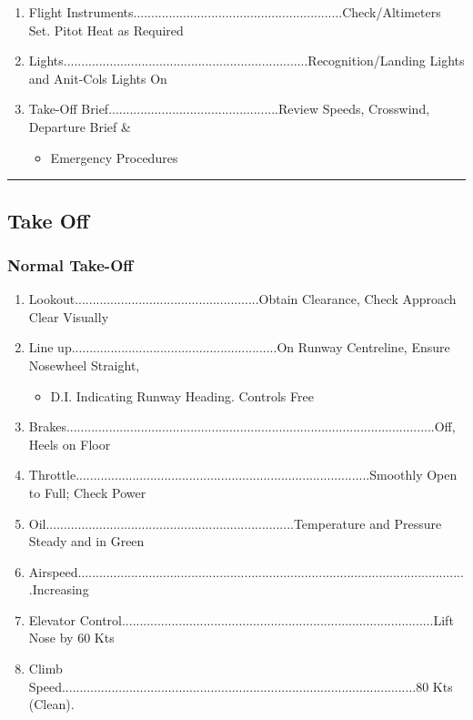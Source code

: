 \documentclass[a4paper]{article}
\newenvironment{checklist}{
  \begin{itemize}[leftmargin=*, align=left]
    \setlength{\itemsep}{2pt}
    \setlength{\parskip}{0pt}
    \setlength{\parsep}{0pt}
}{
  \end{itemize}
}
\newenvironment{numberedchecklist}{
  \begin{enumerate}[label=\arabic*., leftmargin=*, align=left]
    \setlength{\itemsep}{2pt}
    \setlength{\parskip}{0pt}
    \setlength{\parsep}{0pt}
}{
  \end{enumerate}
}
\begin{document}
\begin{numberedchecklist}
\item Flight Instruments...........................................................Check/Altimeters Set. Pitot Heat as Required
\item Lights.....................................................................Recognition/Landing Lights and Anit-Cols Lights On
\item Take-Off Brief................................................Review Speeds, Crosswind, Departure Brief \&
  \begin{checklist}
  \item Emergency Procedures
  \end{checklist}
\end{numberedchecklist}

\rule{\linewidth}{0.4pt}

\subsection*{Take Off}

\subsubsection*{Normal Take-Off}
\begin{numberedchecklist}
\item Lookout....................................................Obtain Clearance, Check Approach Clear Visually
\item Line up..........................................................On Runway Centreline, Ensure Nosewheel Straight,
  \begin{checklist}
  \item D.I. Indicating Runway Heading. Controls Free
  \end{checklist}
\item Brakes........................................................................................................Off, Heels on Floor
\item Throttle...................................................................................Smoothly Open to Full; Check Power
\item Oil......................................................................Temperature and Pressure Steady and in Green
\item Airspeed..............................................................................................................Increasing
\item Elevator Control........................................................................................Lift Nose by 60 Kts
\item Climb Speed....................................................................................................80 Kts (Clean).
\end{numberedchecklist}
\end{document}
